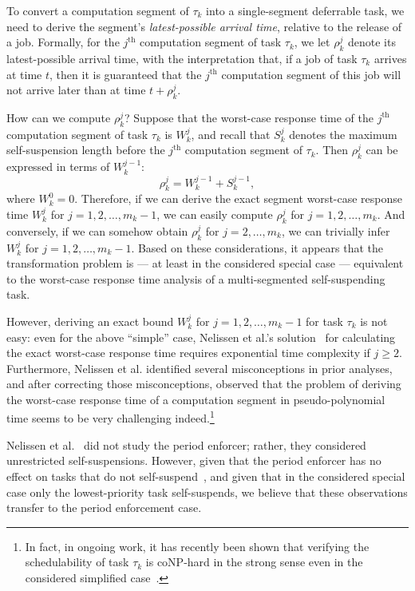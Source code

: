 To  convert a computation segment of $\tau_k$ into a single-segment deferrable task, we need to derive the segment's \emph{latest-possible arrival time}, relative to the release of a job. Formally,  for the $j^{\mathrm{th}}$ computation segment of task $\tau_k$, we let $\rho_k^j$ denote its latest-possible arrival time, with the interpretation that, if a job of task $\tau_k$ arrives at time $t$, then  it is guaranteed that the $j^{\mathrm{th}}$ computation segment of this job will not arrive later than at time $t+\rho_k^j$.

How can we compute $\rho_k^j$? Suppose that the worst-case response time of the $j^{\mathrm{th}}$ computation segment of task $\tau_k$ is $W_k^j$, and recall that $S_k^{j}$ denotes the maximum self-suspension length before the $j^{\mathrm{th}}$ computation segment of $\tau_k$. Then $\rho_k^j$ can be expressed in terms of $W_k^{j-1}$:
$$
	\rho_k^j = W_k^{j-1}+S_k^{j-1},
$$
where $W_k^0 = 0$.  Therefore, if we can derive the exact segment worst-case response time $W_k^j$ for $j=1,2,\ldots,m_k-1$, we can easily compute $\rho_k^j$  for $j=1,2,\ldots,m_k$. And conversely, if we can somehow obtain $\rho_k^j$  for $j=2,\ldots,m_k$, we  can trivially infer $W_k^j$ for $j=1,2,\ldots,m_k-1$.
Based on these considerations, it appears that the transformation problem is  --- at least in the considered special case --- equivalent to the  worst-case response time analysis of a multi-segmented self-suspending task. 

However, deriving an exact bound $W_k^j$ for $j=1,2,\ldots,m_k-1$ for task $\tau_k$ is not easy: 
even for the above ``simple'' case, Nelissen et al.'s solution~\cite{ecrts15nelissen} for calculating the exact worst-case response time requires exponential time complexity if $j \geq 2$. Furthermore, Nelissen et al. \cite{ecrts15nelissen} identified several misconceptions in prior analyses, and after correcting those misconceptions, observed that the problem of deriving the worst-case response time of a computation segment in pseudo-polynomial time seems to be very challenging indeed.\footnote{In fact, in ongoing work, it has recently been shown that verifying the schedulability of task $\tau_k$ is coNP-hard in the strong sense even in the considered simplified case~\cite{Chen2016b}.}

Nelissen et al.~\cite{ecrts15nelissen} did not study the period enforcer; rather, they considered unrestricted self-suspensions. However, given that the period enforcer has no effect on tasks that do not self-suspend~\cite{Raj:suspension1991}, and given that in the considered special case only the lowest-priority task self-suspends, we believe that these observations transfer to the period enforcement case.

